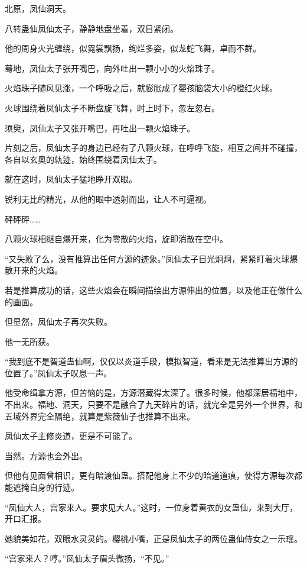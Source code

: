 
\begin{this_body}

北原，凤仙洞天。

八转蛊仙凤仙太子，静静地盘坐着，双目紧闭。

他的周身火光缠绕，似霓裳飘扬，绚烂多姿，似龙蛇飞舞，卓而不群。

蓦地，凤仙太子张开嘴巴，向外吐出一颗小小的火焰珠子。

火焰珠子随风见涨，一个呼吸之后，就膨胀成了婴孩脑袋大小的橙红火球。

火球围绕着凤仙太子不断盘旋飞舞，时上时下，忽左忽右。

须臾，凤仙太子又张开嘴巴，再吐出一颗火焰珠子。

片刻之后，凤仙太子的身边已经有了八颗火球，在呼呼飞旋，相互之间并不碰撞，各自以玄奥的轨迹，始终围绕着凤仙太子。

就在这时，凤仙太子猛地睁开双眼。

锐利无比的精光，从他的眼中透射而出，让人不可逼视。

砰砰砰……

八颗火球相继自爆开来，化为零散的火焰，旋即消散在空中。

“又失败了么，没有推算出任何方源的迹象。”凤仙太子目光炯炯，紧紧盯着火球爆散开来的火焰。

若是推算成功的话，这些火焰会在瞬间描绘出方源伸出的位置，以及他正在做什么的画面。

但显然，凤仙太子再次失败。

他一无所获。

“我到底不是智道蛊仙啊，仅仅以炎道手段，模拟智道，看来是无法推算出方源的位置了。”凤仙太子叹息一声。

他受命缉拿方源，但苦恼的是，方源潜藏得太深了。很多时候，他都深居福地中，不出来。福地、洞天，只要不是融合了九天碎片的话，就完全是另外一个世界，和五域外界完全隔绝，就算是紫薇仙子也推算不出来。

凤仙太子主修炎道，更是不可能了。

当然。方源也会外出。

但他有见面曾相识，更有暗渡仙蛊。搭配他身上不少的暗道道痕，使得方源每次都能遮掩自身的行迹。

“凤仙大人，宫家来人。要求见大人。”这时，一位身着黄衣的女蛊仙，来到大厅，开口汇报。

她貌美如花，双眼水灵灵的。樱桃小嘴，正是凤仙太子的两位蛊仙侍女之一乐瑶。

“宫家来人？哼。”凤仙太子眉头微扬，“不见。”


\end{this_body}
